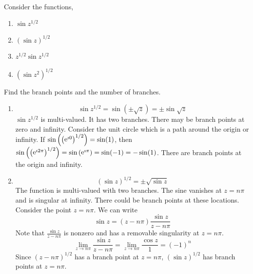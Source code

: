 \begin{Example}
  Consider the functions,
  \begin{enumerate}
  \item $\sin z^{1/2}$
  \item $(\sin z)^{1/2}$
  \item $z^{1/2} \sin z^{1/2}$
  \item $\left( \sin z^2 \right)^{1/2}$
  \end{enumerate}
  Find the branch points and the number of branches.

  \begin{enumerate}
  \item
    \[ 
    \sin z^{1/2} = \sin \left( \pm \sqrt{z} \right) = \pm \sin \sqrt{z} 
    \]
    $\sin z^{1/2}$ is multi-valued.  It has two branches.
    There may be branch points at zero and infinity.
    Consider the unit circle which is a path around the origin or infinity.
    If $\sin\left( \left( \mathop{\mathrm{e}}\nolimits^{\imath 0} \right)^{1/2} \right) = \sin(1)$, then
    $\sin\left( \left( \mathop{\mathrm{e}}\nolimits^{\imath 2 \pi} \right)^{1/2} \right) = \sin\left( \mathop{\mathrm{e}}\nolimits^{\imath \pi} \right) 
    = \sin (-1) = - \sin(1)$.
    There are branch points at the origin and infinity.
  \item
    \[ 
    (\sin z)^{1/2} = \pm \sqrt{ \sin z } 
    \]
    The function is multi-valued with two branches.  
    The sine vanishes at $z = n \pi$ and is singular at infinity.  
    There could be branch points at these locations.  
    Consider the point $z = n \pi$.  We can write
    \[
    \sin z = (z - n \pi) \frac{\sin z}{z - n \pi}
    \]
    Note that $\frac{\sin z}{z - n \pi}$ is nonzero and has a
    removable singularity at $z = n \pi$.
    \[
    \lim_{z \to n \pi} \frac{\sin z}{z - n \pi} = \lim_{z \to n \pi} \frac{\cos z}{1} = (-1)^n
    \]
    Since $(z - n \pi)^{1/2}$ has a branch point at $z = n \pi$, $(\sin z)^{1/2}$ has 
    branch points at $z = n \pi$.  


\end{enumerate}
\end{Example}
